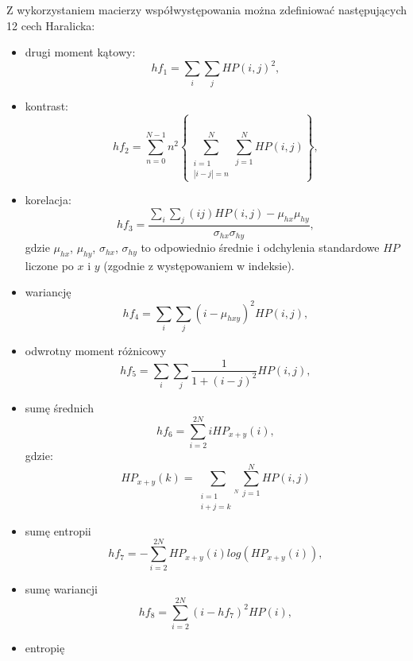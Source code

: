 Z wykorzystaniem macierzy współwystępowania można zdefiniować następujących 12 cech Haralicka:
\begin{itemize}
	\item drugi moment kątowy:
	\begin{equation}
		hf_1 = \sum_i \sum_j {HP(i,j)}^2,
	\end{equation} 
	\item kontrast:
	\begin{equation}
		hf_2 = \sum_{n=0}^{N-1}n^2\left\{{\sum_{\substack{i=1\\|i-j|=n}}^{N} \sum_{j=1}^{N}} HP(i,j)\right\},
	\end{equation}  
	\item korelacja:
	\begin{equation}
		hf_3 = \frac{\sum_{i} \sum_{j}(ij)HP(i,j) - \mu_{hx}\mu_{hy}}{\sigma_{hx}\sigma_{hy}},
	\end{equation}
	gdzie $\mu_{hx}$, $\mu_{hy}$, $\sigma_{hx}$, $\sigma_{hy}$ to odpowiednio średnie i odchylenia standardowe $HP$ liczone po $x$ i $y$ (zgodnie z występowaniem w indeksie).  
	\item wariancję
	\begin{equation}
		hf_4 = \sum_i \sum_j (i - \mu_{hxy})^2 HP(i,j),
	\end{equation}
	\item odwrotny moment różnicowy
	\begin{equation}
		hf_5 = \sum_i \sum_j \frac{1}{1+(i-j)^2}HP(i,j),
	\end{equation} 
	\item sumę średnich
	\begin{equation}
		hf_6 = \sum_{i=2}^{2N}i HP_{x+y}(i),
	\end{equation} 
	gdzie:
	 \begin{equation}
	 HP_{x+y}(k) = \sum_{\substack{i=1 \\ i+j = k}^{N}} \sum_{j=1}^{N} HP(i,j)
	 \end{equation}
	\item sumę entropii
	\begin{equation}
		hf_7 = - \sum_{i=2}^{2N}HP_{x+y}(i) log(HP_{x+y}(i)),
	\end{equation} 
	\item sumę wariancji
	\begin{equation}
		hf_8 = \sum_{i=2}^{2N}(i - hf_7)^2 HP(i),
	\end{equation} 
	\item entropię
	\begin{equation}

\end{equation}
\end{itemize}
